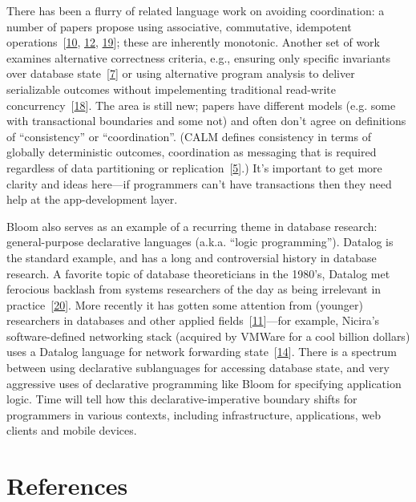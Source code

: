 \documentclass[b5paper,11pt,twoside,openright]{book}
\begin{document}
There has been a flurry of related language work on avoiding
coordination: a number of papers propose using associative, commutative,
idempotent
operations~{{[}\protect\hyperlink{ref-clements2015scalable}{10},
  \protect\hyperlink{ref-quicksand}{12},
  \protect\hyperlink{ref-crdt}{19}{]}}; these are inherently monotonic.
Another set of work examines alternative correctness criteria, e.g.,
ensuring only specific invariants over database
state~{{[}\protect\hyperlink{ref-coord-avoid}{7}{]}} or using
alternative program analysis to deliver serializable outcomes without
impelementing traditional read-write
concurrency~{{[}\protect\hyperlink{ref-roy2015homeostasis}{18}{]}}. The
area is still new; papers have different models (e.g. some with
transactional boundaries and some not) and often don't agree on
definitions of ``consistency'' or ``coordination''. (CALM defines
consistency in terms of globally deterministic outcomes, coordination as
messaging that is required regardless of data partitioning or
replication~{{[}\protect\hyperlink{ref-ameloot2013relational}{5}{]}}.)
It's important to get more clarity and ideas here---if programmers can't
have transactions then they need help at the app-development layer.

Bloom also serves as an example of a recurring theme in database
research: general-purpose declarative languages (a.k.a. ``logic
programming''). Datalog is the standard example, and has a long and
controversial history in database research. A favorite topic of database
theoreticians in the 1980's, Datalog met ferocious backlash from systems
researchers of the day as being irrelevant in
practice~{{[}\protect\hyperlink{ref-lagunabeach}{20}{]}}. More recently
it has gotten some attention from (younger) researchers in databases and
other applied
fields~{{[}\protect\hyperlink{ref-green2013datalog}{11}{]}}---for
example, Nicira's software-defined networking stack (acquired by VMWare
for a cool billion dollars) uses a Datalog language for network
forwarding state~{{[}\protect\hyperlink{ref-koponen2014network}{14}{]}}.
There is a spectrum between using declarative sublanguages for accessing
database state, and very aggressive uses of declarative programming like
Bloom for specifying application logic. Time will tell how this
declarative-imperative boundary shifts for programmers in various
contexts, including infrastructure, applications, web clients and mobile
devices.

\section*{References}
\end{document}
